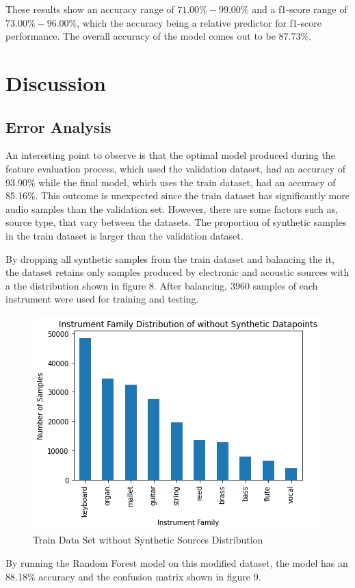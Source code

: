 \documentclass{article}
\begin{document}
These results show an accuracy range of $71.00\%-99.00\%$ and a f1-score range of $73.00\%-96.00\%$, which the accuracy being a relative predictor for f1-score performance. The overall accuracy of the model comes out to be  $87.73\%$.


\section{Discussion}

\subsection{Error Analysis}

An interesting point to observe is that the optimal model produced during the feature evaluation process, which used the validation dataset, had an accuracy of 93.90\% while the final model, which uses the train dataset, had an accuracy of 85.16\%. This outcome is unexpected since the train dataset has significantly more audio samples than the validation set. However, there are some factors such as, source type, that vary between the datasets. The proportion of synthetic samples in the train dataset is larger than the validation dataset.

By dropping all synthetic samples from the train dataset and balancing the it, the dataset retains only samples produced by electronic and acoustic sources with a the distribution shown in figure 8. After balancing, 3960 samples of each instrument were used for training and testing.

\begin{figure}[htb]
  \centering
  \includegraphics[width=.5\linewidth]{nonsynth_distribution}
  \caption{Train Data Set without Synthetic Sources Distribution}
\end{figure}

By running the Random Forest model on this modified dataset, the model has an 88.18\% accuracy and the confusion matrix shown in figure 9.
\end{document}

